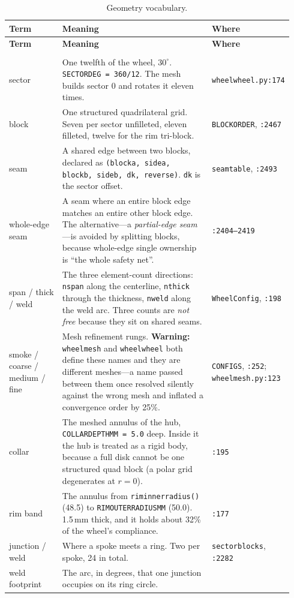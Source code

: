\documentclass[11pt,a4paper]{article}
\makeatletter
\DeclareRobustCommand{\code}[1]{%
  \texttt{\small\def\_{\textunderscore\discretionary{}{}{}}#1}}
\newcommand{\at}[2]{\code{#1:#2}}
\newenvironment{termtable}[1]
  {\small\begin{longtable}{@{}>{\raggedright\arraybackslash}p{0.19\linewidth}
                             >{\raggedright\arraybackslash}p{0.54\linewidth}
                             >{\raggedright\arraybackslash}p{0.21\linewidth}@{}}
   \caption{#1}\\
   \toprule
   \textbf{Term} & \textbf{Meaning} & \textbf{Where} \\
   \midrule
   \endfirsthead
   \toprule
   \textbf{Term} & \textbf{Meaning} & \textbf{Where} \\
   \midrule
   \endhead
   \midrule
   \multicolumn{3}{r@{}}{\emph{continued on the next page}}\\
   \endfoot
   \bottomrule
   \endlastfoot}
  {\end{longtable}}
\makeatother
\begin{document}
\begin{termtable}{Geometry vocabulary.}
sector &
  One twelfth of the wheel, $30^\circ$. \code{SECTOR\_DEG = 360/12}. The mesh builds
  sector 0 and rotates it eleven times. &
  \at{wheel\_wheel.py}{174} \\
\addlinespace
block &
  One structured quadrilateral grid. Seven per sector unfilleted, eleven filleted,
  twelve for the rim tri-block. &
  \code{BLOCK\_ORDER}, \code{:2467} \\
\addlinespace
seam &
  A shared edge between two blocks, declared as
  \code{(block\_a, side\_a, block\_b, side\_b, dk, reverse)}. \code{dk} is the sector
  offset. &
  \code{\_seam\_table}, \code{:2493} \\
\addlinespace
whole-edge seam &
  A seam where an entire block edge matches an entire other block edge. The
  alternative---a \emph{partial-edge seam}---is avoided by splitting blocks, because
  whole-edge single ownership is ``the whole safety net''. &
  \code{:2404--2419} \\
\addlinespace
span / thick / weld &
  The three element-count directions: \code{n\_span} along the centerline,
  \code{n\_thick} through the thickness, \code{n\_weld} along the weld arc. Three counts
  are \emph{not free} because they sit on shared seams. &
  \code{WheelConfig}, \code{:198} \\
\addlinespace
smoke / coarse / medium / fine &
  Mesh refinement rungs. \textbf{Warning:} \code{wheel\_mesh} and \code{wheel\_wheel}
  both define these names and they are different meshes---a name passed between them
  once resolved silently against the wrong mesh and inflated a convergence order by
  25\%. &
  \code{CONFIGS}, \code{:252}; \at{wheel\_mesh.py}{123} \\
\addlinespace
collar &
  The meshed annulus of the hub, \code{COLLAR\_DEPTH\_MM = 5.0} deep. Inside it the hub
  is treated as a rigid body, because a full disk cannot be one structured quad block
  (a polar grid degenerates at $r = 0$). &
  \code{:195} \\
\addlinespace
rim band &
  The annulus from \code{rim\_inner\_radius()} (48.5) to
  \code{RIM\_OUTER\_RADIUS\_MM} (50.0). 1.5\,mm thick, and it holds about 32\% of the
  wheel's compliance. &
  \code{:177} \\
\addlinespace
junction / weld &
  Where a spoke meets a ring. Two per spoke, 24 in total. &
  \code{sector\_blocks}, \code{:2282} \\
\addlinespace
weld footprint &
  The arc, in degrees, that one junction occupies on its ring circle. &

\end{termtable}
\end{document}
